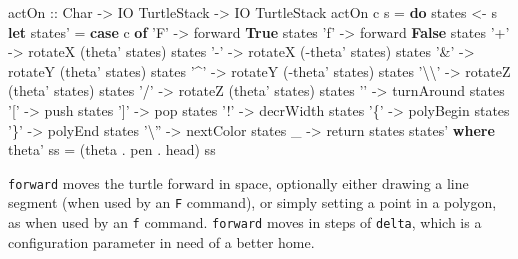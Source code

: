 \documentclass[]{article}
\newenvironment{Shaded}{}{}
\newcommand{\KeywordTok}[1]{\textcolor[rgb]{0.00,0.44,0.13}{\textbf{{#1}}}}
\newcommand{\DataTypeTok}[1]{\textcolor[rgb]{0.56,0.13,0.00}{{#1}}}
\newcommand{\CharTok}[1]{\textcolor[rgb]{0.25,0.44,0.63}{{#1}}}
\newcommand{\OtherTok}[1]{\textcolor[rgb]{0.00,0.44,0.13}{{#1}}}
\newcommand{\FunctionTok}[1]{\textcolor[rgb]{0.02,0.16,0.49}{{#1}}}
\newcommand{\NormalTok}[1]{{#1}}
\begin{document}
\begin{Shaded}
\begin{Highlighting}[]
\OtherTok{actOn     ::} \DataTypeTok{Char} \OtherTok{->} \DataTypeTok{IO} \DataTypeTok{TurtleStack} \OtherTok{->} \DataTypeTok{IO} \DataTypeTok{TurtleStack}
\NormalTok{actOn c s  }\FunctionTok{=} \KeywordTok{do} \NormalTok{states }\OtherTok{<-} \NormalTok{s}
                \KeywordTok{let} \NormalTok{states' }\FunctionTok{=} \KeywordTok{case} \NormalTok{c }\KeywordTok{of}
                           \CharTok{'F'}  \OtherTok{->} \NormalTok{forward }\KeywordTok{True}  \NormalTok{states}
                           \CharTok{'f'}  \OtherTok{->} \NormalTok{forward }\KeywordTok{False} \NormalTok{states}
                           \CharTok{'+'}  \OtherTok{->} \NormalTok{rotateX (theta' states) states}
                           \CharTok{'-'}  \OtherTok{->} \NormalTok{rotateX (}\FunctionTok{-}\NormalTok{theta' states) states}
                           \CharTok{'&'}  \OtherTok{->} \NormalTok{rotateY (theta' states) states}
                           \CharTok{'^'}  \OtherTok{->} \NormalTok{rotateY (}\FunctionTok{-}\NormalTok{theta' states) states}
                           \CharTok{'\textbackslash{}\textbackslash{}'} \OtherTok{->} \NormalTok{rotateZ (theta' states) states}
                           \CharTok{'/'}  \OtherTok{->} \NormalTok{rotateZ (theta' states) states}
                           \CharTok{'\textbar{}'}  \OtherTok{->} \NormalTok{turnAround states}
                           \CharTok{'['}  \OtherTok{->} \NormalTok{push      states}
                           \CharTok{']'}  \OtherTok{->} \NormalTok{pop       states}
                           \CharTok{'!'}  \OtherTok{->} \NormalTok{decrWidth states}
                           \CharTok{'\{'}  \OtherTok{->} \NormalTok{polyBegin states}
                           \CharTok{'\}'}  \OtherTok{->} \NormalTok{polyEnd   states}
                           \CharTok{'\textbackslash{}''} \OtherTok{->} \NormalTok{nextColor states}
                           \NormalTok{_    }\OtherTok{->} \FunctionTok{return}    \NormalTok{states}
                \NormalTok{states'}
             \KeywordTok{where} \NormalTok{theta' ss }\FunctionTok{=} \NormalTok{(theta }\FunctionTok{.} \NormalTok{pen }\FunctionTok{.} \FunctionTok{head}\NormalTok{) ss}
\end{Highlighting}
\end{Shaded}
\texttt{forward} moves the turtle forward in space, optionally either
drawing a line segment (when used by an \texttt{F} command), or simply
setting a point in a polygon, as when used by an \texttt{f} command.
\texttt{forward} moves in steps of \texttt{delta}, which is a
configuration parameter in need of a better home.
\end{document}

